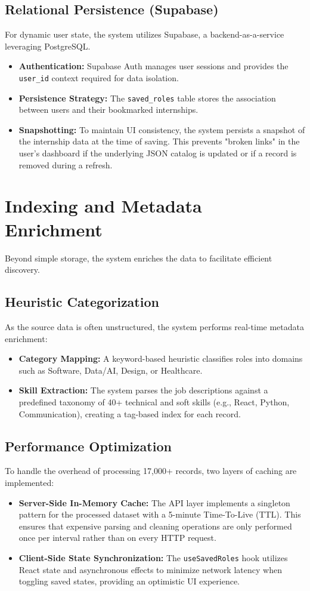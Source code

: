 \subsection{Relational Persistence (Supabase)}
For dynamic user state, the system utilizes Supabase, a backend-as-a-service leveraging PostgreSQL.
\begin{itemize}
    \item \textbf{Authentication:} Supabase Auth manages user sessions and provides the \texttt{user\_id} context required for data isolation.
    \item \textbf{Persistence Strategy:} The \texttt{saved\_roles} table stores the association between users and their bookmarked internships.
    \item \textbf{Snapshotting:} To maintain UI consistency, the system persists a snapshot of the internship data at the time of saving. This prevents "broken links" in the user's dashboard if the underlying JSON catalog is updated or if a record is removed during a refresh.
\end{itemize}

\section{Indexing and Metadata Enrichment}
Beyond simple storage, the system enriches the data to facilitate efficient discovery.

\subsection{Heuristic Categorization}
As the source data is often unstructured, the system performs real-time metadata enrichment:
\begin{itemize}
    \item \textbf{Category Mapping:} A keyword-based heuristic classifies roles into domains such as Software, Data/AI, Design, or Healthcare.
    \item \textbf{Skill Extraction:} The system parses the job descriptions against a predefined taxonomy of 40+ technical and soft skills (e.g., React, Python, Communication), creating a tag-based index for each record.
\end{itemize}

\subsection{Performance Optimization}
To handle the overhead of processing 17,000+ records, two layers of caching are implemented:
\begin{itemize}
    \item \textbf{Server-Side In-Memory Cache:} The API layer implements a singleton pattern for the processed dataset with a 5-minute Time-To-Live (TTL). This ensures that expensive parsing and cleaning operations are only performed once per interval rather than on every HTTP request.
    \item \textbf{Client-Side State Synchronization:} The \texttt{useSavedRoles} hook utilizes React state and asynchronous effects to minimize network latency when toggling saved states, providing an optimistic UI experience.
\end{itemize}

